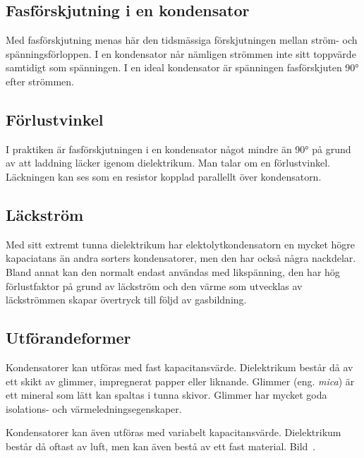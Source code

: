 \subsection{Fasförskjutning i en kondensator}

Med fasförskjutning menas här den tidsmässiga förskjutningen mellan ström- och
spänningsförloppen.
I en kondensator når nämligen strömmen inte sitt toppvärde samtidigt som
spänningen.
I en ideal kondensator är spänningen fasförskjuten \ang{90} efter strömmen.

\subsection{Förlustvinkel}

I praktiken är fasförskjutningen i en kondensator något mindre än \ang{90} på
grund av att laddning läcker igenom dielektrikum.
Man talar om en förlustvinkel.
Läckningen kan ses som en resistor kopplad parallellt över kondensatorn.

\subsection{Läckström}

Med sitt extremt tunna dielektrikum har elektolytkondensatorn en mycket högre
kapaciatans än andra sorters kondensatorer, men den har också några nackdelar.
Bland annat kan den normalt endast användas med likspänning, den har hög 
förlustfaktor på grund av läckström och den värme som utvecklas av läckströmmen 
skapar övertryck till följd av gasbildning.

\subsection{Utförandeformer}

Kondensatorer kan utföras med fast kapacitansvärde.
Dielektrikum består då av ett skikt av glimmer, impregnerat papper eller
liknande.
Glimmer (eng. \emph{mica}) är ett mineral som lätt kan spaltas i tunna skivor.
Glimmer har mycket goda isolations- och värmeledningsegenskaper.

Kondensatorer kan även utföras med variabelt kapacitansvärde.
Dielektrikum består då oftast av luft, men kan även bestå av ett fast material.
Bild~.

